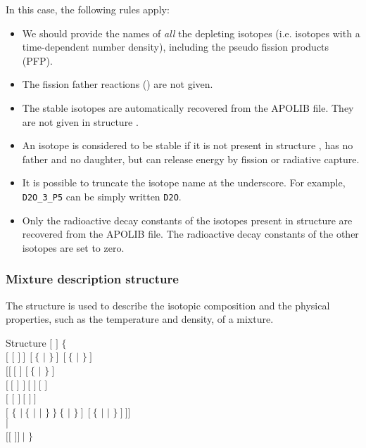 \vskip 0.15cm

In this case, the following rules apply:
\begin{itemize}
\item We should provide the names  of {\sl all} the depleting
isotopes (i.e. isotopes with a time-dependent number density), including the
pseudo fission products (PFP).
\item The fission father reactions () are not given.
\item The stable isotopes are automatically recovered from the
APOLIB file. They are not given in structure .
\item An isotope is considered to be stable if it is not present in
structure , has no father and no daughter,
but can release energy by fission or radiative capture.
\item It is possible to truncate the isotope name  at the
underscore. For example, {\tt D2O\_3\_P5} can be simply written {\tt D2O}.
\item Only the radioactive decay constants of the isotopes present in
structure  are recovered from the APOLIB file. The
radioactive decay constants of the other isotopes are set to zero.
\end{itemize}

\subsubsection{Mixture description structure}\label{sect:descmix}

The structure  is used to describe the isotopic composition and
the physical properties, such as the temperature and density, of a mixture.

\begin{DataStructure}{Structure }
 $[$  $]$ $\{$ \\
\hskip 1.0cm $[$ $[$  $]~]~~[~\{$  $|$  $\}~]~~[~\{$ 
    $|$ $\}~]$\\
\hskip 2.0cm $[[~[$  \moc{=} $]$   $[~\{$  
    $|$  $\}~]$\\
\hskip 2.0cm $[~[$  $]$  $]~[$   $]~[$   $]$ \\
\hskip 2.0cm $[$    $[$   $]~[$  $]~]$ \\
\hskip 2.0cm $[$  $\{$  $|~\{$  $|$  $|$ $\}~\}~\{$
 $|$  $\}~]~~[~\{$  $|$  $|$  $\}~]~]]$ \\
\hskip 1.0cm $|$ \\
\hskip 1.0cm  $[[$   $]]~|$   $\}$
\end{DataStructure}

